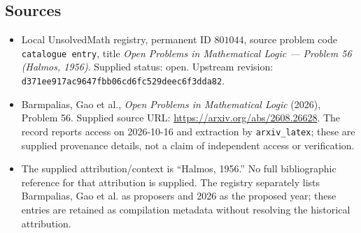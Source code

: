 \documentclass[11pt]{article}
\begin{document}
\subsection{Sources}
\begin{itemize}
\item Local UnsolvedMath registry, permanent ID \(801044\), source problem code \texttt{catalogue entry}, title \emph{Open Problems in Mathematical Logic --- Problem 56 (Halmos, 1956)}. Supplied status: open. Upstream revision: \texttt{d371ee917ac9647fbb06cd6fc529deec6f3dda82}.
\item Barmpalias, Gao et al., \emph{Open Problems in Mathematical Logic} (2026), Problem 56. Supplied source URL: \url{https://arxiv.org/abs/2608.26628}. The record reports access on 2026-10-16 and extraction by \texttt{arxiv\_latex}; these are supplied provenance details, not a claim of independent access or verification.
\item The supplied attribution/context is ``Halmos, 1956.'' No full bibliographic reference for that attribution is supplied. The registry separately lists Barmpalias, Gao et al. as proposers and 2026 as the proposed year; these entries are retained as compilation metadata without resolving the historical attribution.
\end{itemize}
\end{document}

